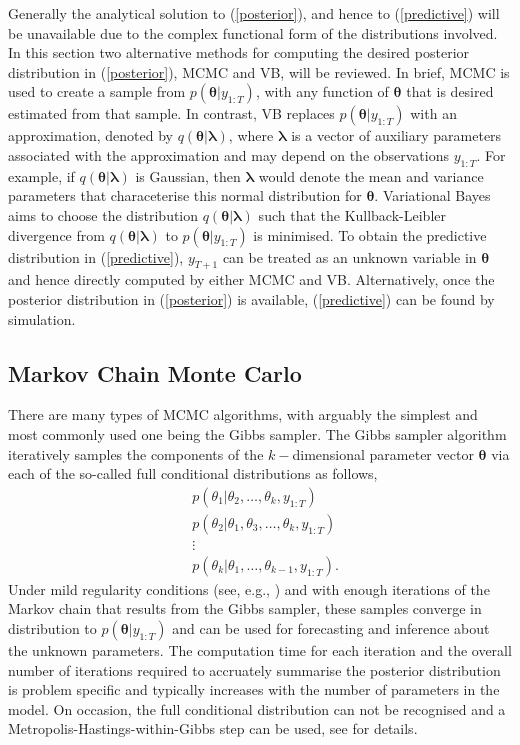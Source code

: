 \documentclass[12pt,a4paper]{article}%
\numberwithin{equation}{section}
\begin{document}
Generally the analytical solution to (\ref{posterior}), and hence to (\ref{predictive}) will be unavailable due to the complex functional form of the distributions involved. 
In this section two alternative methods for computing the desired posterior distribution in (\ref{posterior}),  MCMC and VB, will be reviewed.
In brief, MCMC is used to create a sample from $p(\boldsymbol{\theta} | y_{1:T})$, with any function of $\boldsymbol{\theta}$ that is desired estimated from that sample. In contrast, VB replaces $p(\boldsymbol{\theta} | y_{1:T})$ with an approximation, denoted by $q(\boldsymbol{\theta} | \boldsymbol{\lambda})$, where $\boldsymbol{\lambda}$ is a vector of auxiliary parameters associated with the approximation and may depend on the observations $y_{1:T}$.
For example, if $q(\boldsymbol{\theta} | \boldsymbol{\lambda})$ is Gaussian, then $\boldsymbol{\lambda}$ would denote the mean and variance parameters that characeterise this normal distribution for $\boldsymbol{\theta}$.  Variational Bayes aims to choose the distribution $q(\boldsymbol{\theta} | \boldsymbol{\lambda})$ such that the Kullback-Leibler divergence from $q(\boldsymbol{\theta} | \boldsymbol{\lambda})$ to $p(\boldsymbol{\theta} | y_{1:T})$ is minimised. To obtain the predictive distribution in (\ref{predictive}), $y_{T+1}$ can be treated as an unknown variable in $\boldsymbol{\theta}$ and hence directly computed by either MCMC and VB. Alternatively, once the posterior distribution in (\ref{posterior}) is available, (\ref{predictive}) can be found by simulation.

\subsection{Markov Chain Monte Carlo} \label{sec:MCMC}

There are many types of MCMC algorithms, with arguably the simplest and most commonly used one being the Gibbs sampler. The Gibbs sampler algorithm iteratively samples the components of the $k-$dimensional parameter vector $\boldsymbol{\theta}$ via each of the so-called full conditional distributions as follows,
\begin{align}
&p(\theta_1 | \theta_2, \dots, \theta_k, y_{1:T}) \nonumber \\
&p(\theta_2 | \theta_1, \theta_3, \dots, \theta_k, y_{1:T}) \nonumber \\
&\vdots \nonumber \\
&p(\theta_k | \theta_1, \dots, \theta_{k-1}, y_{1:T}). \nonumber
\end{align}
Under mild regularity conditions (see, e.g., \citet{Tierney1994}) and with enough iterations of the Markov chain that results from the Gibbs sampler, these samples converge in distribution to $p(\boldsymbol{\theta} | y_{1:T})$ and can be used for forecasting and inference about the unknown parameters. The computation time for each iteration and the overall number of iterations required to accruately summarise the posterior distribution is problem specific and typically increases with the number of parameters in the model. On occasion, the full conditional distribution can not be recognised and a Metropolis-Hastings-within-Gibbs step can be used, see \citet{Gilks1995} for details.
\end{document}
